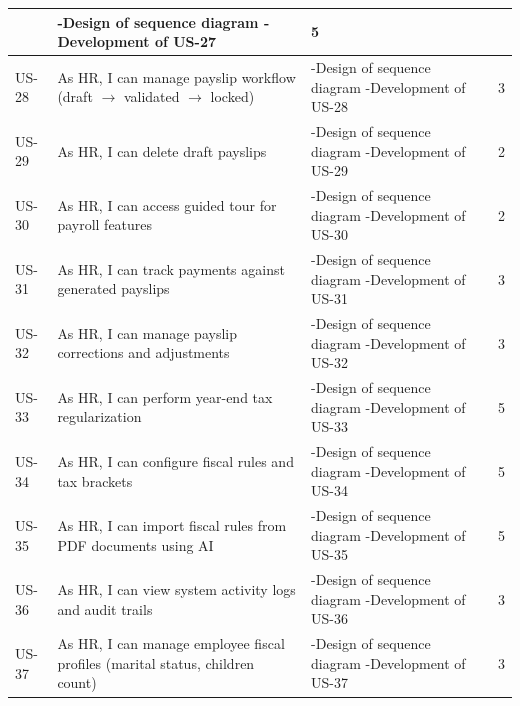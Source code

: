 \begin{longtable}{
    |p{}
    |p{}|
    p{}|
    p{}| 
}
    & -Design of sequence diagram\newline
-Development of US-27 & 5 \\
    \hline
    US-28 & As HR, I can manage payslip workflow (draft $\rightarrow$ validated $\rightarrow$ locked)
    & -Design of sequence diagram\newline
-Development of US-28 & 3 \\
    \hline
    US-29 & As HR, I can delete draft payslips
    & -Design of sequence diagram\newline
-Development of US-29 & 2 \\
    \hline
    US-30 & As HR, I can access guided tour for payroll features
    & -Design of sequence diagram\newline
-Development of US-30 & 2 \\
    \hline
    US-31 & As HR, I can track payments against generated payslips
    & -Design of sequence diagram\newline
-Development of US-31 & 3 \\
    \hline
    US-32 & As HR, I can manage payslip corrections and adjustments
    & -Design of sequence diagram\newline
-Development of US-32 & 3 \\
    \hline
    US-33 & As HR, I can perform year-end tax regularization
    & -Design of sequence diagram\newline
-Development of US-33 & 5 \\
    \hline
    US-34 & As HR, I can configure fiscal rules and tax brackets
    & -Design of sequence diagram\newline
-Development of US-34 & 5 \\
    \hline
    US-35 & As HR, I can import fiscal rules from PDF documents using AI
    & -Design of sequence diagram\newline
-Development of US-35 & 5 \\
    \hline
    US-36 & As HR, I can view system activity logs and audit trails
    & -Design of sequence diagram\newline
-Development of US-36 & 3 \\
    \hline
    US-37 & As HR, I can manage employee fiscal profiles (marital status, children count)
    & -Design of sequence diagram\newline
-Development of US-37 & 3 \\
    \hline
\end{longtable}


